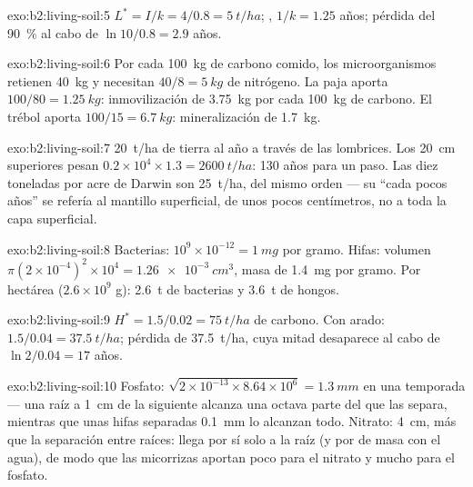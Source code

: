 \begin{solution}{exo:b2:living-soil:5}
$L^{*} = I/k = 4/0.8 = \qty{5}{t/ha}$; , $1/k = 1.25$
años; pérdida del \qty{90}{\%} al cabo de $\ln 10/0.8 = 2.9$ años.
\end{solution}

\begin{solution}{exo:b2:living-soil:6}
Por cada \qty{100}{kg} de carbono comido, los microorganismos retienen
\qty{40}{kg} y necesitan $40/8 = \qty{5}{kg}$ de nitrógeno. La paja aporta
$100/80 =
\qty{1.25}{kg}$: inmovilización de \qty{3.75}{kg} por cada \qty{100}{kg}
de carbono. El trébol aporta $100/15 = \qty{6.7}{kg}$: mineralización
de \qty{1.7}{kg}.
\end{solution}

\begin{solution}{exo:b2:living-soil:7}
\qty{20}{t/ha} de tierra al año a través de las lombrices. Los
\qty{20}{cm} superiores pesan $0.2\times 10^{4}\times 1.3 = \qty{2600}{t/ha}$:
130 años para un paso. Las diez toneladas por acre de Darwin son
\qty{25}{t/ha}, del mismo orden --- su ``cada pocos años'' se refería al
mantillo superficial, de unos pocos centímetros, no a toda la capa
superficial.
\end{solution}

\begin{solution}{exo:b2:living-soil:8}
Bacterias: $10^{9}\times 10^{-12} = \qty{1}{mg}$ por gramo. Hifas:
volumen $\pi(2\times 10^{-4})^{2}\times 10^{4} = \qty{1.26e-3}{cm^3}$,
masa de \qty{1.4}{mg} por gramo. Por hectárea ($2.6\times 10^{9}$ g):
\qty{2.6}{t} de bacterias y \qty{3.6}{t} de hongos.
\end{solution}

\begin{solution}{exo:b2:living-soil:9}
$H^{*} = 1.5/0.02 = \qty{75}{t/ha}$ de carbono. Con arado: $1.5/0.04
= \qty{37.5}{t/ha}$; pérdida de \qty{37.5}{t/ha}, cuya mitad desaparece al
cabo de $\ln 2/0.04 = 17$ años.
\end{solution}

\begin{solution}{exo:b2:living-soil:10}
Fosfato: $\sqrt{2\times 10^{-13}\times 8.64\times 10^{6}} =
\qty{1.3}{mm}$ en una temporada --- una raíz a \qty{1}{cm} de la siguiente
alcanza una octava parte del  que las separa, mientras que unas hifas
separadas \qty{0.1}{mm} lo alcanzan todo. Nitrato: \qty{4}{cm}, más que la
separación entre raíces: llega por sí solo a la raíz (y por  de masa
con el agua), de modo que las micorrizas aportan poco para el nitrato y
mucho para el fosfato.
\end{solution}

